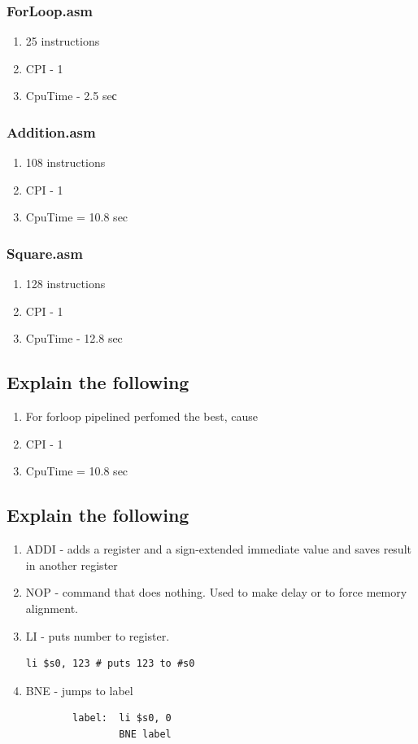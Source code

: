 \documentclass[10pt]{article}
\begin{document}
        \subsubsection{ForLoop.asm}
        \begin{enumerate}
            \item 25 instructions
            \item CPI - 1
            \item CpuTime - 2.5 seс
        \end{enumerate}
        \subsubsection{Addition.asm}
        \begin{enumerate}
            \item 108 instructions
            \item CPI - 1
            \item CpuTime = 10.8 sec
        \end{enumerate}
        \subsubsection{Square.asm}
        \begin{enumerate}
            \item 128 instructions
            \item CPI - 1
            \item CpuTime - 12.8 sec            
        \end{enumerate}


\subsection{Explain the following}
    \begin{enumerate}
        \item For forloop pipelined perfomed the best, cause
        \item CPI - 1
        \item CpuTime = 10.8 sec
        \end{enumerate}
\subsection{Explain the following}
    \begin{enumerate}
        \item ADDI - adds a register and a sign-extended immediate value and saves result in another register
        \item NOP - command that does nothing. Used to make delay or to force memory alignment.
        \item LI - puts number to register.
        \begin{verbatim}li $s0, 123 # puts 123 to #s0\end{verbatim}
        \item BNE - jumps to label
        \begin{verbatim}
        label:  li $s0, 0
                BNE label
        \end{verbatim}
    \end{enumerate}
\end{document}
